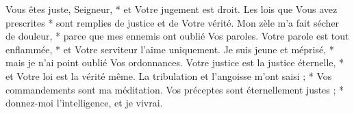 Vous êtes juste, Seigneur, * et Votre jugement est droit.
\versseparator
Les lois que Vous avez prescrites * sont remplies de justice et de Votre vérité.
\versseparator
Mon zèle m'a fait sécher de douleur, * parce que mes ennemis ont oublié Vos paroles.
\versseparator
Votre parole est tout enflammée, * et Votre serviteur l'aime uniquement.
\versseparator
Je suis jeune et méprisé, * mais je n'ai point oublié Vos ordonnances.
\versseparator
Votre justice est la justice éternelle, * et Votre loi est la vérité même.
\versseparator
La tribulation et l'angoisse m'ont saisi ; * Vos commandements sont ma méditation.
\versseparator
Vos préceptes sont éternellement justes ; * donnez-moi l'intelligence, et je vivrai.